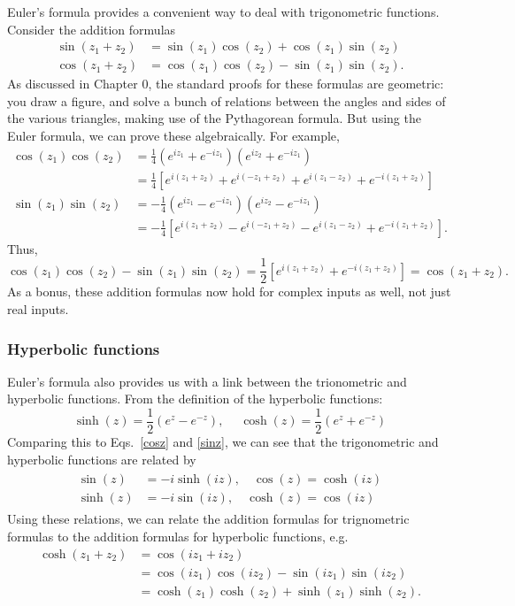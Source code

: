 \documentclass[10pt,a4paper]{article}
\begin{document}
Euler's formula provides a convenient way to deal with trigonometric
functions. Consider the addition formulas
\begin{align}
  \sin(z_1 + z_2) &= \sin(z_1) \cos(z_2) + \cos(z_1)\sin(z_2) \\
  \cos(z_1 + z_2) &= \cos(z_1) \cos(z_2) - \sin(z_1)\sin(z_2).
\end{align}
As discussed in Chapter 0, the standard proofs for these formulas are
geometric: you draw a figure, and solve a bunch of relations between
the angles and sides of the various triangles, making use of the
Pythagorean formula. But using the Euler formula, we can prove these
algebraically. For example,
\begin{align}
  \cos(z_1)\cos(z_2) &= \frac{1}{4}\left(e^{iz_1} + e^{-iz_1}\right) \left(e^{iz_2} + e^{-iz_1}\right)\\&= \frac{1}{4}\left[e^{i(z_1+z_2)} + e^{i(-z_1 + z_2)} + e^{i(z_1 -z_2)} + e^{-i(z_1+z_2)}\right] \\ \sin(z_1)\sin(z_2) &= -\frac{1}{4}\left(e^{iz_1} - e^{-iz_1}\right) \left(e^{iz_2} - e^{-iz_1}\right) \\ &= -\frac{1}{4}\left[e^{i(z_1+z_2)} - e^{i(-z_1 + z_2)} - e^{i(z_1 -z_2)} + e^{-i(z_1+z_2)}\right].
\end{align}
Thus,
\begin{equation}
  \cos(z_1) \cos(z_2) - \sin(z_1)\sin(z_2) = \frac{1}{2}\left[e^{i(z_1+z_2)} + e^{-i(z_1+z_2)}\right] = \cos(z_1 + z_2).
\end{equation}
As a bonus, these addition formulas now hold for complex inputs as well,
not just real inputs.

\subsubsection{Hyperbolic functions}
\label{hyperbolic-functions}

Euler's formula also provides us with a link between the trionometric
and hyperbolic functions. From the definition of the hyperbolic
functions:
\begin{equation}
\sinh(z) = \frac{1}{2}\left(e^{z} - e^{-z}\right), \quad\; \cosh(z) = \frac{1}{2}\left(e^{z} + e^{-z}\right)
\end{equation}
Comparing this to Eqs.~\eqref{cosz} and \eqref{sinz}, we can see that
the trigonometric and hyperbolic functions are related by
\begin{align}
  \begin{aligned}
    \sin(z) &= -i \sinh(iz), \quad \cos(z) = \cosh(iz) \\
    \sinh(z) &= -i \sin(iz), \quad \cosh(z) = \cos(iz)
  \end{aligned}
\end{align}
Using these relations, we can relate the addition formulas for
trignometric formulas to the addition formulas for hyperbolic functions,
e.g.
\begin{align}
  \cosh(z_1+z_2) &= \cos(iz_1 + iz_2) \\
  &= \cos(iz_1)\cos(iz_2) - \sin(iz_1)\sin(iz_2) \\
  &= \cosh(z_1)\cosh(z_2) + \sinh(z_1)\sinh(z_2).
\end{align}
\end{document}
